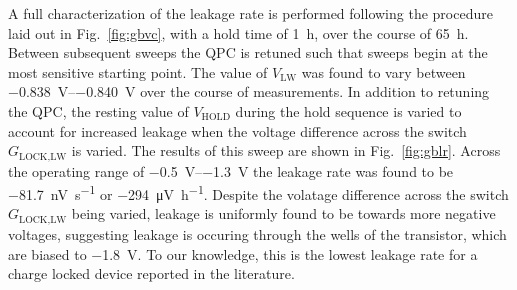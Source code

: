 A full characterization of the leakage rate is performed following the procedure laid out in Fig.~\ref{fig:gbvc}, with a hold time of \SI{1}{\hour}, over the course of \SI{65}{\hour}. Between subsequent sweeps the QPC is retuned such that sweeps begin at the most sensitive starting point. The value of $V_\textrm{LW}$ was found to vary between \SIrange{-0.838}{-0.840}{\volt} over the course of measurements. In addition to retuning the QPC, the resting value of $V_\textrm{HOLD}$ during the hold sequence is varied to account for increased leakage when the voltage difference across the switch $G_\textrm{LOCK,LW}$ is varied. The results of this sweep are shown in Fig.~\ref{fig:gblr}. Across the operating range of \SIrange{-0.5}{-1.3}{\volt} the leakage rate was found to be \SI{-81.7}{\nano\volt\per\second} or \SI{-294}{\micro\volt\per\hour}. Despite the volatage difference across the switch $G_\textrm{LOCK,LW}$ being varied, leakage is uniformly found to be towards more negative voltages, suggesting leakage is occuring through the wells of the transistor, which are biased to \SI{-1.8}{\volt}. To our knowledge, this is the lowest leakage rate for a charge locked device reported in the literature.





